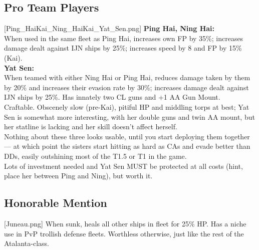 \subsection{ Pro Team Players}
[Ping_HaiKai_Ning_HaiKai_Yat_Sen.png]
{\textbf{Ping Hai, Ning Hai:}\\
When used in the same fleet as Ping Hai, increases own FP by 35\%; increases damage dealt against IJN ships by 25\%; increases speed by 8 and FP by 15\% (Kai).\\
\textbf{Yat Sen:}\\ 
When teamed with either Ning Hai or Ping Hai, reduces damage taken by them by 20\% and increases their evasion rate by 30\%; increases damage dealt against IJN ships by 25\%. Has innately two CL guns and +1 AA Gun Mount.\\
Craftable.}
{}
{Obscenely slow (pre-Kai), pitiful HP and middling torps at best; Yat Sen is somewhat more interesting, with her double guns and twin AA mount, but her statline is lacking and her skill doesn't affect herself.\\
Nothing about these three looks usable, until you start deploying them together --- at which point the sisters start hitting as hard as CAs and evade better than DDs, easily outshining most of the T1.5 or T1 in the game.\\
Lots of investment needed and Yat Sen MUST be protected at all costs (hint, place her between Ping and Ning), but worth it.}
 
 
\newpage
\subsection{ Honorable Mention}
[Juneau.png]
{When sunk, heals all other ships in fleet for 25\% HP.}
{}
{Has a niche use in PvP trollish defense fleets. Worthless otherwise, just like the rest of the Atalanta-class.}
 
